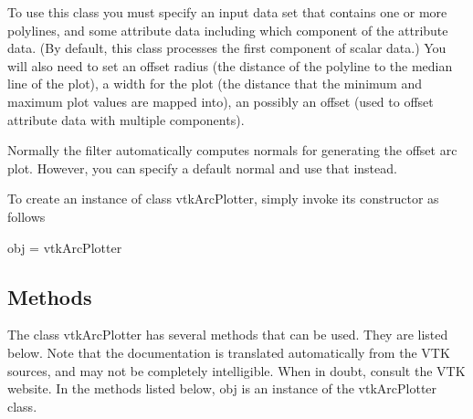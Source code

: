 To use this class you must specify an input data set that contains one or more polylines, and some attribute data including which component of the attribute data. (By default, this class processes the first component of scalar data.) You will also need to set an offset radius (the distance of the polyline to the median line of the plot), a width for the plot (the distance that the minimum and maximum plot values are mapped into), an possibly an offset (used to offset attribute data with multiple components).

Normally the filter automatically computes normals for generating the offset arc plot. However, you can specify a default normal and use that instead.

To create an instance of class vtk\-Arc\-Plotter, simply invoke its constructor as follows \begin{DoxyVerb}  obj = vtkArcPlotter
\end{DoxyVerb}
 \hypertarget{vtkwidgets_vtkxyplotwidget_Methods}{}\subsection{Methods}\label{vtkwidgets_vtkxyplotwidget_Methods}
The class vtk\-Arc\-Plotter has several methods that can be used. They are listed below. Note that the documentation is translated automatically from the V\-T\-K sources, and may not be completely intelligible. When in doubt, consult the V\-T\-K website. In the methods listed below, {\ttfamily obj} is an instance of the vtk\-Arc\-Plotter class. 
